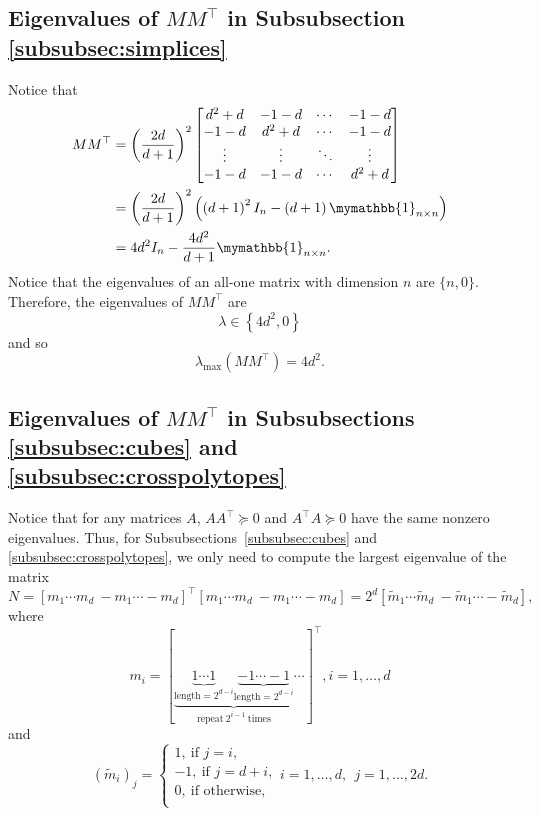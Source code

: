 \documentclass[smallextended, envcountsame]{svjour3}
\begin{document}
\subsection{Eigenvalues of $MM^\top$ in Subsubsection \ref{subsubsec:simplices}}\label{app:simplices_eigv}
Notice that
\begin{align*}
    MM^\top &= \left(\frac{2d}{d+1}\right)^2 \begin{bmatrix}
        d^2+d & -1-d & \cdots & -1-d\\
        -1-d & d^2+d & \cdots & -1-d\\
        \vdots & \vdots & \ddots & \vdots\\
        -1-d & -1-d & \cdots & d^2+d
    \end{bmatrix}\\
    &= \left(\frac{2d}{d+1}\right)^2\left(\left(d+1\right)^2I_n-\left(d+1\right)\mymathbb{1}_{n\times n}\right)\\
    &= 4d^2I_n-\frac{4d^2}{d+1}\mymathbb{1}_{n\times n}.
\end{align*}
Notice that the eigenvalues of an all-one matrix with dimension $n$ are $\{n,0\}$.  Therefore, the eigenvalues of $MM^\top$ are
\begin{equation*}
    \lambda\in\left\{4d^2, 0\right\}
\end{equation*}
and so
\begin{equation*}
    \lambda_{\max}(MM^\top) = 4d^2.
\end{equation*}

\subsection{Eigenvalues of $MM^\top$ in Subsubsections \ref{subsubsec:cubes} and \ref{subsubsec:crosspolytopes}}\label{app:cubescrosspolytopes_eigv}

Notice that for any matrices $A$, $AA^\top\succeq 0$ and $A^\top A\succeq 0$ have the same nonzero eigenvalues.  Thus, for Subsubsections~\ref{subsubsec:cubes} and \ref{subsubsec:crosspolytopes}, we only need to compute the largest eigenvalue of the matrix
\begin{equation*}
    N = \left[m_1\cdots m_d~-m_1\cdots -m_d\right]^\top \left[m_1\cdots m_d~-m_1\cdots -m_d\right] = 2^d \left[\widetilde{m}_1\cdots \widetilde{m}_d~-\widetilde{m}_1\cdots -\widetilde{m}_d\right],
\end{equation*}
where
\begin{equation*}
    m_i=\left[\underbrace{\underbrace{1\cdots 1}_{\text{length}=2^{d-i}}\underbrace{-1\cdots -1}_{\text{length}=2^{d-i}}}_{\text{repeat}~2^{i-1}~\text{times}}\cdots\right]^\top, i=1,\ldots,d
\end{equation*}
and
\begin{equation*}
    \left(\widetilde{m}_i\right)_j = \begin{cases}
        1,~\text{if $j=i$},\\
        -1,~\text{if $j=d+i$},\\
        0,~\text{if otherwise},\\
    \end{cases} 
    i=1,\ldots,d,~~j=1,\ldots,2d.
\end{equation*}
\end{document}
